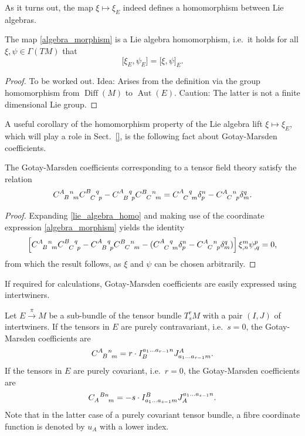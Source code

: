 As it turns out, the map $\xi\mapsto \xi_E$ indeed defines a homomorphism between Lie algebras.
\begin{proposition}
  The map \eqref{algebra_morphism} is a Lie algebra homomorphism, i.e.\ it holds for all $\xi,\psi\in\Gamma(TM)$ that
  \begin{equation}\label{lie_algebra_homo}
    \lbrack \xi_E,\psi_E\rbrack = \lbrack \xi,\psi\rbrack_E.
  \end{equation}
\end{proposition}
\begin{proof}
  To be worked out. Idea: Arises from the definition via the group homomorphism from $\operatorname{Diff}(M)$ to $\operatorname{Aut}(E)$. Caution: The latter is not a finite dimensional Lie group.
\end{proof}
A useful corollary of the homomorphism property of the Lie algebra lift $\xi\mapsto\xi_E$, which will play a role in Sect.\ \ref{}, is the following fact about Gotay-Marsden coefficients.
\begin{corollary}
  The Gotay-Marsden coefficients  corresponding to a tensor field theory satisfy the relation
  \begin{equation}
    \gmc{A}{B}{n}{m} \gmc{B}{C}{q}{p} - \gmc{A}{B}{q}{p} \gmc{B}{C}{n}{m} = \gmc{A}{C}{q}{m} \delta^n_p - \gmc{A}{C}{n}{p} \delta^q_m.
  \end{equation}
\end{corollary}
\begin{proof}
  Expanding \eqref{lie_algebra_homo} and making use of the coordinate expression \eqref{algebra_morphism} yields the identity
  \begin{equation}
    \left\lbrack\gmc{A}{B}{n}{m} \gmc{B}{C}{q}{p} - \gmc{A}{B}{q}{p} \gmc{B}{C}{n}{m} - (\gmc{A}{C}{q}{m}\delta^n_p - \gmc{A}{C}{n}{p}\delta^q_m)\right\rbrack \xi^m_{,n} \psi^p_{,q} = 0,
  \end{equation}
  from which the result follows, as $\xi$ and $\psi$ can be chosen arbitrarily.
\end{proof}

If required for calculations, Gotay-Marsden coefficients are easily expressed using intertwiners.
\begin{proposition}\label{prop_gmc_intertwiner}
  Let $E\overset{\pi}{\longrightarrow} M$ be a sub-bundle of the tensor bundle $T^r_sM$ with a pair $(I,J)$ of intertwiners. If the tensors in $E$ are purely contravariant, i.e.\ $s=0$, the Gotay-Marsden coefficients are
  \begin{equation}\label{gmc_contra}
    \gmc{A}{B}{n}{m} = r \cdot I^{a_1\dots a_{r-1}n}_B J^A_{a_1\dots a_{r-1}m}.
  \end{equation}
  If the tensors in $E$ are purely covariant, i.e.\ $r=0$, the Gotay-Marsden coefficients are
  \begin{equation}
    \gmcd{A}{B}{n}{m} = -s \cdot I^B_{a_1\dots a_{s-1}m} J^{a_1\dots a_{s-1}n}_A.
  \end{equation}
  Note that in the latter case of a purely covariant tensor bundle, a fibre coordinate function is denoted by $u_A$ with a lower index.
\end{proposition}

